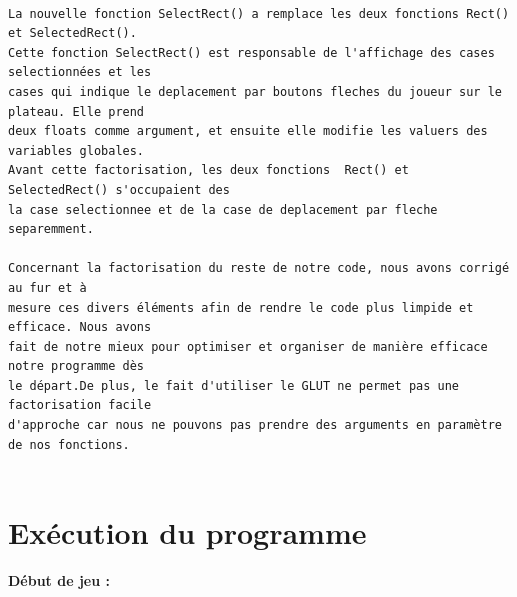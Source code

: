 \documentclass[a4paper]{article}
\begin{document}
\begin{verbatim}

La nouvelle fonction SelectRect() a remplace les deux fonctions Rect() et SelectedRect().
Cette fonction SelectRect() est responsable de l'affichage des cases selectionnées et les 
cases qui indique le deplacement par boutons fleches du joueur sur le plateau. Elle prend 
deux floats comme argument, et ensuite elle modifie les valuers des variables globales.
Avant cette factorisation, les deux fonctions  Rect() et SelectedRect() s'occupaient des 
la case selectionnee et de la case de deplacement par fleche separemment.

Concernant la factorisation du reste de notre code, nous avons corrigé au fur et à 
mesure ces divers éléments afin de rendre le code plus limpide et efficace. Nous avons 
fait de notre mieux pour optimiser et organiser de manière efficace notre programme dès 
le départ.De plus, le fait d'utiliser le GLUT ne permet pas une factorisation facile 
d'approche car nous ne pouvons pas prendre des arguments en paramètre de nos fonctions.


\end{verbatim}

\bigbreak
\bigbreak
\bigbreak
\bigbreak
\bigbreak
\bigbreak
\bigbreak
\bigbreak
\bigbreak
\bigbreak
\bigbreak
\bigbreak
\bigbreak
\bigbreak
\bigbreak
\bigbreak
\bigbreak
\bigbreak
\bigbreak
\bigbreak
\bigbreak
\bigbreak
\bigbreak

\section{Exécution du programme}


\large\bf{Début de jeu :}
\bigbreak
\end{document}
